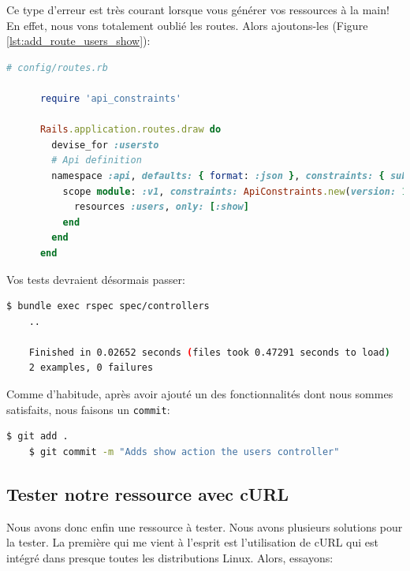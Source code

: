 \documentclass[]{report}
\begin{document}
    Ce type d'erreur est très courant lorsque vous générer vos ressources à la main! En effet, nous vons totalement oublié les routes. Alors ajoutons-les (Figure \ref{lst:add_route_users_show}):

    \begin{scriptsize}
      \begin{lstlisting}[language=ruby, caption={Ajoute de la route Users\#Show}, label={lst:add_route_users_show}]
      # config/routes.rb

      require 'api_constraints'

      Rails.application.routes.draw do
        devise_for :usersto
        # Api definition
        namespace :api, defaults: { format: :json }, constraints: { subdomain: 'api' }, path: '/' do
          scope module: :v1, constraints: ApiConstraints.new(version: 1, default: true) do
            resources :users, only: [:show]
          end
        end
      end
      \end{lstlisting}
    \end{scriptsize}


    Vos tests devraient désormais passer:

    \begin{scriptsize}
    \begin{lstlisting}[language=bash]
    $ bundle exec rspec spec/controllers
    ..

    Finished in 0.02652 seconds (files took 0.47291 seconds to load)
    2 examples, 0 failures
    \end{lstlisting}
    \end{scriptsize}

    Comme d'habitude, après avoir ajouté un des fonctionnalités dont nous sommes satisfaits, nous faisons un \verb|commit|:

    \begin{scriptsize}
    \begin{lstlisting}[language=bash]
    $ git add .
    $ git commit -m "Adds show action the users controller"
    \end{lstlisting}
    \end{scriptsize}

    \subsection{Tester notre ressource avec cURL}

      Nous avons donc enfin une ressource à tester. Nous avons plusieurs solutions pour la tester. La première qui me vient à l'esprit est l'utilisation de cURL qui est intégré dans presque toutes les distributions Linux. Alors, essayons:
\end{document}
